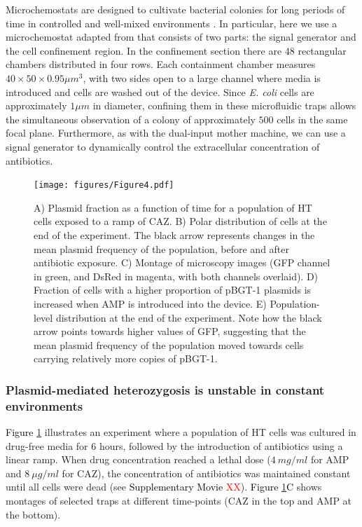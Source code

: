 \documentclass[fleqn,12pt]{wlscirep}
\newcommand{\red}[1]{\textcolor{red}{#1}}
\newcommand{\fig}[1]{\textcolor{black}{#1}}
\begin{document}
Microchemostats are designed to cultivate bacterial colonies for long periods of time in controlled and well-mixed environments \cite{moffitt2012single,mondragon2011entrainment,lopatkin2016antibiotics,li2019dissecting}. In particular, here we use a microchemostat adapted from \cite{mondragon2011entrainment} that consists of two parts: the signal generator and the cell confinement region. In the confinement section there are $48$ rectangular chambers distributed in four rows. Each containment chamber measures $40 \times 50 \times 0.95 \mu m^3$, with two sides open to a large channel where media is introduced and cells are washed out of the device. Since {\em E. coli} cells are approximately $1 \mu m$ in diameter, confining them in these microfluidic traps allows the simultaneous observation of a colony of approximately $500$ cells in the same focal plane. Furthermore, as with the dual-input mother machine, we can use a signal generator to dynamically control the extracellular concentration of antibiotics.


\begin{figure}[h!]
\centering
\texttt{[image: figures/Figure4.pdf]}
\caption{ \small{ A) Plasmid fraction as a function of time for a population of HT cells exposed to a ramp of CAZ.  B) Polar distribution of cells at the end of the experiment. The black arrow represents changes in the mean plasmid frequency of the population, before and after antibiotic exposure. C) Montage of microscopy images (GFP channel in green, and DsRed in magenta, with both channels overlaid).  D) Fraction of cells with a higher proportion of pBGT-1 plasmids is increased when AMP is introduced into the device. E) Population-level distribution at the end of the experiment.  Note how the black arrow points towards higher values of GFP, suggesting that the mean plasmid frequency of the population moved towards cells carrying relatively more copies of pBGT-1.}}
\label{fig:microchemostat}
\end{figure}

\subsubsection{Plasmid-mediated heterozygosis is unstable in constant environments}

\fig{Figure \ref{fig:microchemostat}} illustrates an experiment where a population of HT cells was cultured in drug-free media for 6 hours, followed by the introduction of antibiotics using a linear ramp. When drug concentration reached a lethal dose ($4\ mg/ml$ for AMP and $8\ \mu g/ml$ for CAZ), the concentration of antibiotics was maintained constant until all cells were dead (see \fig{Supplementary Movie \red{XX}}).
\fig{Figure \ref{fig:microchemostat}C} shows montages of selected traps at different time-points (CAZ in the top and AMP at the bottom).  
\end{document}

